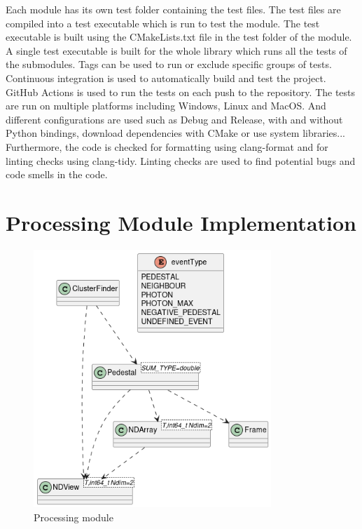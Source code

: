 \begin{spacing}{1.2}
    Each module has its own test folder containing the test files. The test files are compiled
    into a test executable which is run to test the module. The test executable is built using
    the CMakeLists.txt file in the test folder of the module. A single test executable is built
    for the whole library which runs all the tests of the submodules. Tags can be used to run or exclude
    specific groups of tests.\\

    Continuous integration is used to automatically build and test the project. GitHub Actions
    is used to run the tests on each push to the repository. The tests are run on multiple
    platforms including Windows, Linux and MacOS. And different configurations are used such
    as Debug and Release, with and without Python bindings, download dependencies with CMake or use system libraries...
    Furthermore, the code is checked for formatting using clang-format and for linting checks using clang-tidy.
    Linting checks are used to find potential bugs and code smells in the code.\\



    

    \section{Processing Module Implementation}
    \begin{figure}
        \centering
        \includegraphics[width=0.8\textwidth]{Chapitre3/figures/processing_class.png}
        \caption{Processing module}
        \label{fig:processing}
    \end{figure}


\end{spacing}
